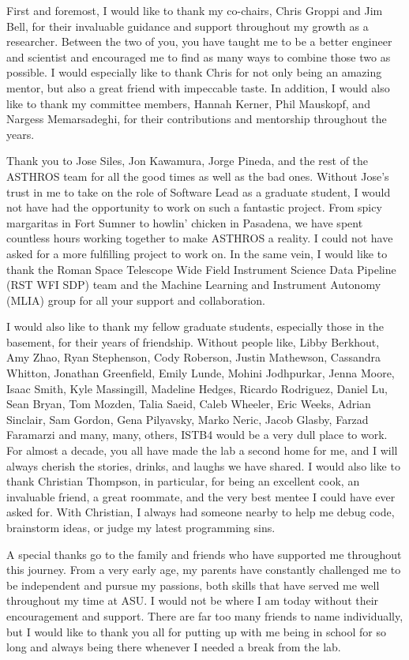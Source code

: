 First and foremost, I would like to thank my co-chairs, Chris Groppi and Jim Bell, for their invaluable guidance and support throughout my growth as a researcher.
Between the two of you, you have taught me to be a better engineer and scientist and encouraged me to find as many ways to combine those two as possible.
I would especially like to thank Chris for not only being an amazing mentor, but also a great friend with impeccable taste. 
In addition, I would also like to thank my committee members, Hannah Kerner, Phil Mauskopf, and Nargess Memarsadeghi, for their contributions and mentorship throughout the years. 

Thank you to Jose Siles, Jon Kawamura, Jorge Pineda, and the rest of the ASTHROS team for all the good times as well as the bad ones.
Without Jose's trust in me to take on the role of Software Lead as a graduate student, I would not have had the opportunity to work on such a fantastic project.
From spicy margaritas in Fort Sumner to howlin' chicken in Pasadena, we have spent countless hours working together to make ASTHROS a reality. 
I could not have asked for a more fulfilling project to work on.
In the same vein, I would like to thank the Roman Space Telescope Wide Field Instrument Science Data Pipeline (RST WFI SDP) team and the Machine Learning and Instrument Autonomy (MLIA) group for all your support and collaboration.

I would also like to thank my fellow graduate students, especially those in the basement, for their years of friendship.
Without people like, Libby Berkhout, Amy Zhao, Ryan Stephenson, Cody Roberson, Justin Mathewson, Cassandra Whitton, Jonathan Greenfield, Emily Lunde, Mohini Jodhpurkar, Jenna Moore, Isaac Smith, Kyle Massingill, Madeline Hedges, Ricardo Rodriguez, Daniel Lu, Sean Bryan, Tom Mozden, Talia Saeid, Caleb Wheeler, Eric Weeks, Adrian Sinclair, Sam Gordon, Gena Pilyavsky, Marko Neric, Jacob Glasby, Farzad Faramarzi and many, many, others, ISTB4 would be a very dull place to work. 
For almost a decade, you all have made the lab a second home for me, and I will always cherish the stories, drinks, and laughs we have shared.
I would also like to thank Christian Thompson, in particular, for being an excellent cook, an invaluable friend, a great roommate, and the very best mentee I could have ever asked for.
With Christian, I always had someone nearby to help me debug code, brainstorm ideas, or judge my latest programming sins.

A special thanks go to the family and friends who have supported me throughout this journey. 
From a very early age, my parents have constantly challenged me to be independent and pursue my passions, both skills that have served me well throughout my time at ASU.
I would not be where I am today without their encouragement and support.
There are far too many friends to name individually, but I would like to thank you all for putting up with me being in school for so long and always being there whenever I needed a break from the lab.

